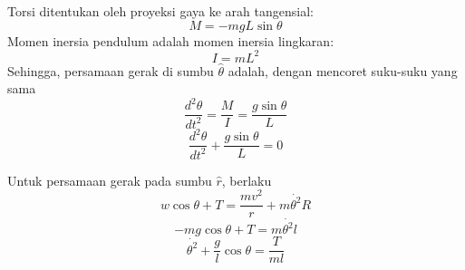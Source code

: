 \documentclass[12pt]{article}
\begin{document}
\begin{enumerate}[label=(\alph*)]
			Torsi ditentukan oleh proyeksi gaya ke arah tangensial:
			\begin{equation}
			M = -mgL\sin \theta
			\end{equation} 
			Momen inersia pendulum adalah momen inersia lingkaran:
			\begin{equation}
			I = mL^2
			\end{equation} 
			Sehingga, persamaan gerak di sumbu $\hat{\theta}$ adalah, dengan mencoret suku-suku yang sama
			\begin{equation}
			\dfrac{d^2\theta}{dt^2} = \dfrac {M}{I} =\dfrac{g \sin\theta}{L} 
			\end{equation} 
			\begin{equation}
			\dfrac{d^2\theta}{dt^2} +  \dfrac{g  \sin\theta}{L}  =0
			\end{equation} 
			
			Untuk persamaan gerak pada sumbu $ \hat{r}$, berlaku
			\begin{equation}
			w \cos \theta +T = \dfrac{mv^2}{r} + m\dot{\theta^2}R
			\end{equation}
			\begin{equation}
			-mg \cos \theta +T = m \dot{\theta^2}l
			\end{equation} 
		\begin{equation}
			 \dot{\theta^2}+\dfrac{g}{l} \cos \theta =\dfrac{T}{ml}
			\end{equation} 
			


\end{enumerate}
\end{document}
